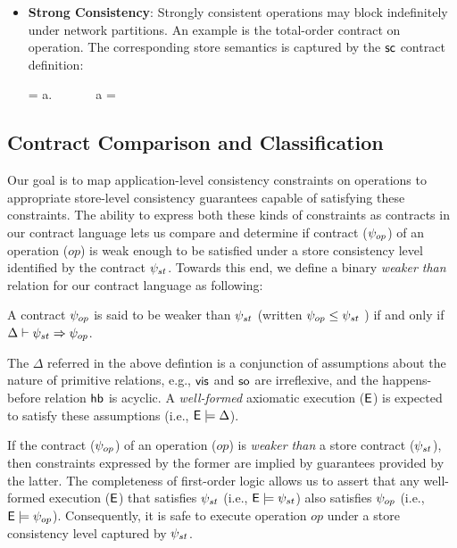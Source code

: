 \begin{itemize}
\item \textbf{Strong Consistency}: Strongly consistent operations may block
  indefinitely under network partitions. An example is the total-order
  contract on  operation. The corresponding store semantics is
	captured by the ${\sf sc}$ contract definition:

  \vspace{-1em}
  \begin{smathpar}
  \scc = \forall a.~ \Rightarrow {} ~\vee~  ~\vee~ a = \cureff
  \end{smathpar}

\end{itemize}



\subsection{Contract Comparison and Classification}

Our goal is to map application-level consistency constraints on operations to
appropriate store-level consistency guarantees capable of satisfying these
constraints.  The ability to express both these kinds of constraints as
contracts in our contract language lets us compare and determine if contract
($\psi_{op}$) of an operation ($\mathit{op}$) is weak enough to be satisfied
under a store consistency level identified by the contract $\psi_{st}$. Towards
this end, we define a binary \emph{weaker than} relation for our contract
language as following:
\begin{definition}
A contract $\psi_{op}$ is said to be weaker than $\psi_{st}$ (written $\psi_{op}
\le \psi_{st}$ ) if and only if $\Delta \vdash \psi_{st} \Rightarrow \psi_{op}$.
\begin{center}
\end{center}
\end{definition}
\vspace{-2em}
\noindent The $\Delta$ referred in the above defintion is a conjunction of
assumptions about the nature of primitive relations, e.g., ${\normalfont \textsf{vis}}$ and ${\normalfont \textsf{so}}$
are irreflexive, and the happens-before relation ${\normalfont \textsf{hb}}$ is acyclic. A
\emph{well-formed} axiomatic execution (${\normalfont \textsf{E}}$) is expected to satisfy these
assumptions (i.e., ${\normalfont \textsf{E}} \models \Delta$).

If the contract ($\psi_{op}$) of an operation ($\mathit{op}$) is \emph{weaker
than} a store contract ($\psi_{st}$), then constraints expressed by the former
are implied by guarantees provided by the latter. The completeness of
first-order logic allows us to assert that any well-formed execution (${\normalfont \textsf{E}}$)
that satisfies $\psi_{st}$ (i.e., ${\normalfont \textsf{E}}\models \psi_{st}$) also satisfies
$\psi_{op}$ (i.e., ${\normalfont \textsf{E}} \models \psi_{op}$). Consequently, it is safe to execute
operation $\mathit{op}$ under a store consistency level captured by $\psi_{st}$.


